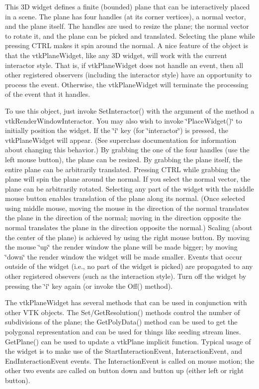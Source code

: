 This 3\-D widget defines a finite (bounded) plane that can be interactively placed in a scene. The plane has four handles (at its corner vertices), a normal vector, and the plane itself. The handles are used to resize the plane; the normal vector to rotate it, and the plane can be picked and translated. Selecting the plane while pressing C\-T\-R\-L makes it spin around the normal. A nice feature of the object is that the vtk\-Plane\-Widget, like any 3\-D widget, will work with the current interactor style. That is, if vtk\-Plane\-Widget does not handle an event, then all other registered observers (including the interactor style) have an opportunity to process the event. Otherwise, the vtk\-Plane\-Widget will terminate the processing of the event that it handles.

To use this object, just invoke Set\-Interactor() with the argument of the method a vtk\-Render\-Window\-Interactor. You may also wish to invoke \char`\"{}\-Place\-Widget()\char`\"{} to initially position the widget. If the \char`\"{}i\char`\"{} key (for \char`\"{}interactor\char`\"{}) is pressed, the vtk\-Plane\-Widget will appear. (See superclass documentation for information about changing this behavior.) By grabbing the one of the four handles (use the left mouse button), the plane can be resized. By grabbing the plane itself, the entire plane can be arbitrarily translated. Pressing C\-T\-R\-L while grabbing the plane will spin the plane around the normal. If you select the normal vector, the plane can be arbitrarily rotated. Selecting any part of the widget with the middle mouse button enables translation of the plane along its normal. (Once selected using middle mouse, moving the mouse in the direction of the normal translates the plane in the direction of the normal; moving in the direction opposite the normal translates the plane in the direction opposite the normal.) Scaling (about the center of the plane) is achieved by using the right mouse button. By moving the mouse \char`\"{}up\char`\"{} the render window the plane will be made bigger; by moving \char`\"{}down\char`\"{} the render window the widget will be made smaller. Events that occur outside of the widget (i.\-e., no part of the widget is picked) are propagated to any other registered obsevers (such as the interaction style). Turn off the widget by pressing the \char`\"{}i\char`\"{} key again (or invoke the Off() method).

The vtk\-Plane\-Widget has several methods that can be used in conjunction with other V\-T\-K objects. The Set/\-Get\-Resolution() methods control the number of subdivisions of the plane; the Get\-Poly\-Data() method can be used to get the polygonal representation and can be used for things like seeding stream lines. Get\-Plane() can be used to update a vtk\-Plane implicit function. Typical usage of the widget is to make use of the Start\-Interaction\-Event, Interaction\-Event, and End\-Interaction\-Event events. The Interaction\-Event is called on mouse motion; the other two events are called on button down and button up (either left or right button).

